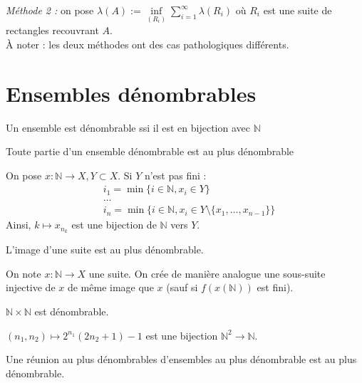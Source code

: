 \documentclass[10pt,a4paper,notitlepage ]{report}
\begin{document}
\emph{Méthode 2 :} on pose $\lambda(A) := \underset{(R_i)}{\inf} \sum_{i=1}^{\infty}  \lambda(R_i)$ où $R_i$ est une suite de rectangles recouvrant $A$. \\

À noter : les deux méthodes ont des cas pathologiques différents.

\section{Ensembles dénombrables}

\begin{definition}
	Un ensemble est dénombrable ssi il est en bijection avec $\mathbb N$
\end{definition}
\begin{propriete}
	Toute partie d'un ensemble dénombrable est au plus dénombrable
\end{propriete}
\begin{demo}
	On pose $x : \mathbb N \rightarrow X, Y \subset X$. Si $Y$ n'est pas fini :
	\begin{align*}
	&i_1 = \min \{i\in\mathbb N, x_i \in Y \} \\
	&\dots  \\
 	&i_n = \min \{ i\in \mathbb N, x_i\in Y \setminus\{x_1, \dots,x_{n-1}\}\}
 	\end{align*} 
	Ainsi, $k \mapsto x_{n_k}$ est une bijection de $\mathbb N$ vers $Y$.
\end{demo}

\begin{propriete}
	L'image d'une suite est au plus dénombrable.
\end{propriete}
\begin{demo}
	On note $x:\mathbb N \rightarrow X$ une suite.
On crée de manière analogue une sous-suite injective de $x$ de même image que $x$ (sauf si $f(x(\mathbb N))$ est fini).
\end{demo}
\begin{propriete}
	$\mathbb N \times \mathbb N$ est dénombrable.
\end{propriete}
\begin{demo}
	$(n_1,n_2) \mapsto 2^{n_1} (2n_2+1) -1$ est une bijection $\mathbb N^2 \rightarrow \mathbb N$.
\end{demo}

\begin{propriete}
	Une réunion au plus dénombrables d'ensembles au plus dénombrable est au plus dénombrable.
\end{propriete}
\end{document}
